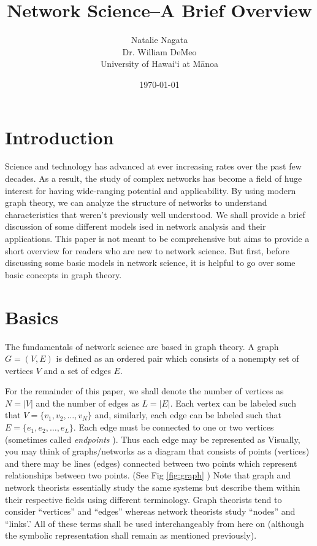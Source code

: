\documentclass{article}
\title{Network Science--A Brief Overview}
\author{Natalie Nagata \\ Dr. William DeMeo \\ University of Hawai\textquoteleft i at M\=anoa}
\date{\today}
\begin{document}
\maketitle

\section{Introduction}
Science and technology has advanced at ever increasing rates over the past few decades.  As a result, the study of complex networks has become a field of huge interest for having wide-ranging potential and applicability.  By using modern graph theory, we can analyze the structure of networks to understand characteristics that weren't previously well understood. We shall provide a brief discussion of some different models ised in network analysis and their applications.  This paper is not meant to be comprehensive but aims to provide a short overview for readers who are new to network science. But first, before discussing some basic models in network science, it is helpful to go over some basic concepts in graph theory.  



\section{Basics}

The fundamentals of network science are based in graph theory.  A graph $G=(V,E)$ is defined as an ordered pair which consists of a nonempty set of vertices $V$ and a set of edges $E$.  

For the remainder of this paper, we shall denote the number of vertices as $N = |V|$ and the number of edges as $L= |E|$. Each vertex can be labeled such that $V = \{ v_1 , v_2 , \ldots , v_N\}$ and, similarly, each edge can be labeled such that $E = \{e_1 , e_2 , \ldots , e_L  \}$. Each edge must be connected to one or two vertices (sometimes called \textit{endpoints} \; \cite{discrete}). Thus each edge may be represented as  Visually, you may think of graphs/networks as a diagram that consists of points (vertices) and there may be lines (edges) connected between two points which represent relationships between two points. (See Fig \ref{fig:graph} )  Note that graph and network theorists essentially study the same systems but describe them within their respective fields using different terminology.  Graph theorists tend to consider ``vertices'' and ``edges'' whereas network theorists study ``nodes'' and ``links'.'  All of these terms shall be used interchangeably from here on (although the symbolic representation shall remain as mentioned previously).
\end{document}
